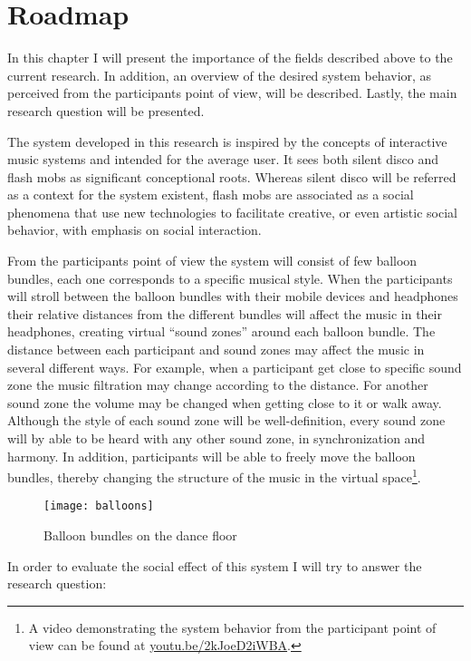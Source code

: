 \section{Roadmap}\label{roadmap}

In this chapter I will present the importance of the fields described above to the current research.
In addition, an overview of the desired system behavior, as perceived from the participants point of view, will be described.
Lastly, the main research question will be presented.

The system developed in this research is inspired by the concepts of interactive music systems and intended for the average user.
It sees both silent disco and flash mobs as significant conceptional roots.
Whereas silent disco will be referred as a context for the system existent, flash mobs are associated as a social phenomena that use new technologies to facilitate creative, or even artistic social behavior, with emphasis on social interaction.

From the participants point of view the system will consist of few balloon bundles, each one corresponds to a specific musical style.
When the participants will stroll between the balloon bundles with their mobile devices and headphones their relative distances from the different bundles will affect the music in their headphones, creating virtual ``sound zones'' around each balloon bundle.
The distance between each participant and sound zones may affect the music in several different ways.
For example, when a participant get close to specific sound zone the music filtration may change according to the distance.
For another sound zone the volume may be changed when getting close to it or walk away.
Although the style of each sound zone will be well-definition, every sound zone will by able to be heard with any other sound zone, in synchronization and harmony.
In addition, participants will be able to freely move the balloon bundles, thereby changing the structure of the music in the virtual space\footnote{A video demonstrating the system behavior from the participant point of view can be found at \href{http://youtu.be/2kJoeD2iWBA}{youtu.be/2kJoeD2iWBA}.}.

\begin{figure}[h]
	\texttt{[image: balloons]}
	\caption{Balloon bundles on the dance floor}
\end{figure}

In order to evaluate the social effect of this system I will try to answer the research question: \emph{\reserchquestion}